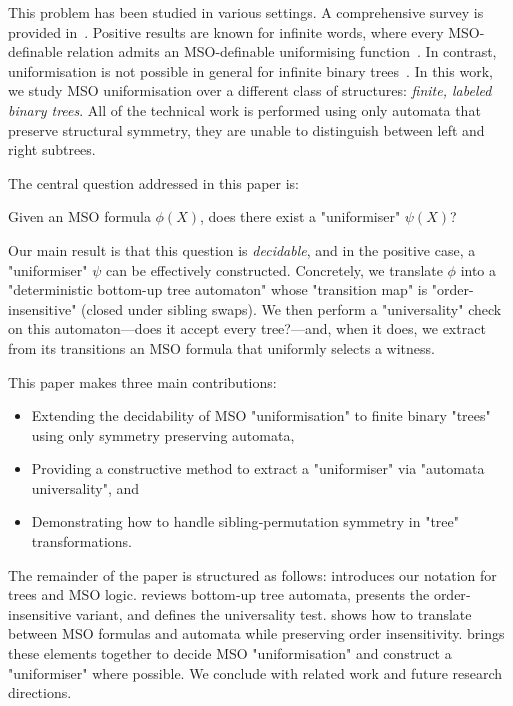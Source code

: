 \documentclass[a4paper,UKenglish,cleveref, autoref, thm-restate]{lipics-v2021}
\begin{document}
This problem has been studied in various settings. A comprehensive survey is provided in~\cite{Cara15}. Positive results are known for infinite words, where every MSO-definable
relation admits an MSO-definable uniformising function~\cite{Siefkes1975, Choffrut1999, Rabin07}. In contrast, uniformisation is not possible in general for infinite binary
trees~\cite{GS83}.
In this work, we study MSO uniformisation over a different class of structures: \emph{finite, labeled binary trees}.
All of the technical work is performed using only automata that preserve structural symmetry,
\ie they are unable to distinguish between left and right subtrees.

The central question addressed in this paper is:

\begin{problem}\label{prob:uniformisation-problem}
\AP Given an MSO formula $\phi(X)$, does there exist a "uniformiser" $\psi(X)$?
\end{problem}

Our main result is that this question is \emph{decidable}, and in the positive case, a "uniformiser" $\psi$ can be effectively constructed. Concretely, we translate $\phi$ into a
"deterministic bottom-up tree automaton" whose "transition map" is "order-insensitive" (\ie closed under sibling swaps). We then perform a "universality" check on this
automaton—does it accept every tree?—and, when it does, we extract from its transitions an MSO formula that uniformly selects a witness.

This paper makes three main contributions:
\begin{itemize}
	\item Extending the decidability of MSO "uniformisation" to finite binary "trees" using only symmetry preserving automata,
	\item Providing a constructive method to extract a "uniformiser" via "automata universality", and
	\item Demonstrating how to handle sibling‐permutation symmetry in "tree" transformations.
\end{itemize}




The remainder of the paper is structured as follows:
 introduces our notation for trees and MSO logic.
 reviews bottom‐up tree automata, presents the order‐insensitive variant, and defines the universality test.
 shows how to translate between MSO formulas and automata while preserving order insensitivity.
 brings these elements together to decide MSO "uniformisation" and construct a "uniformiser" where possible.
We conclude with related work and future research directions.
\end{document}
